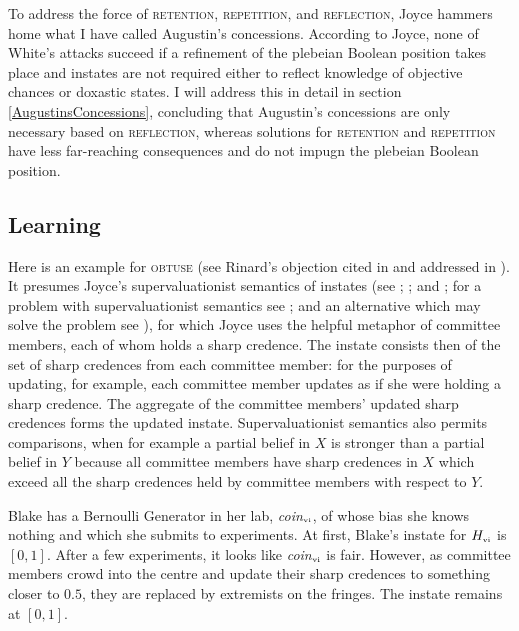 \documentclass[12pt]{article}
\begin{document}
To address the force of \textsc{retention}, \textsc{repetition}, and
\textsc{reflection}, Joyce hammers home what I have called Augustin's
concessions. According to Joyce, none of White's attacks succeed if a
refinement of the plebeian Boolean position takes place and instates
are not required either to reflect knowledge of objective chances or
doxastic states. I will address this in detail in section
\ref{AugustinsConcessions}, concluding that Augustin's concessions are
only necessary based on \textsc{reflection}, whereas solutions for 
\textsc{retention} and \textsc{repetition} have less far-reaching
consequences and do not impugn the plebeian Boolean position.

\subsection{Learning}
\label{learning}

Here is an example for \textsc{obtuse} (see Rinard's objection cited
in  and addressed in ).
It presumes Joyce's supervaluationist semantics of instates (see
; ; and
; for a problem with supervaluationist semantics
see ; and an alternative which may solve the
problem see ), for which Joyce uses the
helpful metaphor of committee members, each of whom holds a sharp
credence. The instate consists then of the set of sharp credences from
each committee member: for the purposes of updating, for example, each
committee member updates as if she were holding a sharp credence. The
aggregate of the committee members' updated sharp credences forms the
updated instate. Supervaluationist semantics also permits comparisons,
when for example a partial belief in $X$ is stronger than a partial
belief in $Y$ because all committee members have sharp credences in
$X$ which exceed all the sharp credences held by committee members
with respect to $Y$.

\begin{quotex}
  \label{ex:learning} Blake has a Bernoulli
  Generator in her lab, \textit{coin}$_{\mbox{\tiny{vi}}}$, of whose
  bias she knows nothing and which she submits to experiments. At first,
  Blake's instate for $H_{\mbox{\tiny{vi}}}$ is $[0,1]$. After a few
  experiments, it looks like \textit{coin}$_{\mbox{\tiny{vi}}}$ is
  fair. However, as committee members crowd into the centre and update
  their sharp credences to something closer to $0.5$, they are
  replaced by extremists on the fringes. The instate remains at
  $[0,1]$. 
\end{quotex}
\end{document}
